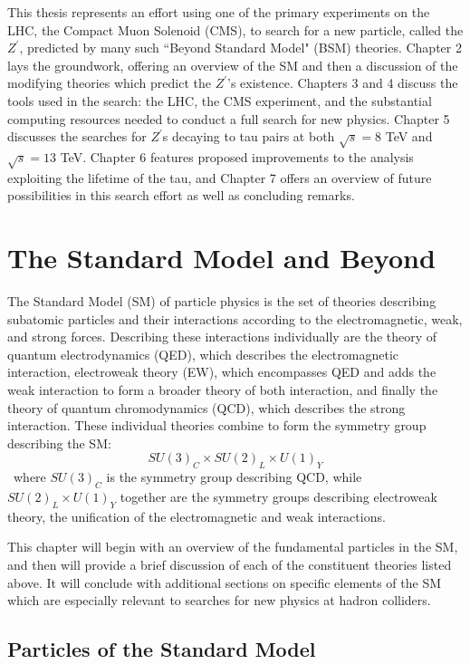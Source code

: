 This thesis represents an effort using one of the primary experiments on the LHC, the Compact Muon Solenoid (CMS), to search for a new particle, called the \emph{$Z^\prime$}, predicted by many such ``Beyond Standard Model" (BSM) theories. Chapter 2 lays the groundwork, offering an overview of the SM and then a discussion of the modifying theories which predict the $Z^\prime$'s existence. Chapters 3 and 4 discuss the tools used in the search: the LHC, the CMS experiment, and the substantial computing resources needed to conduct a full search for new physics. Chapter 5 discusses the searches for $Z^\prime$s decaying to tau pairs at both $\sqrt{s} = 8$ TeV and $\sqrt{s} = 13$ TeV. Chapter 6 features proposed improvements to the analysis exploiting the lifetime of the tau, and Chapter 7 offers an overview of future possibilities in this search effort as well as concluding remarks.
\clearpage

\chapter{The Standard Model and Beyond}


The Standard Model (SM) of particle physics is the set of theories describing subatomic particles and their interactions according to the electromagnetic, weak, and strong forces. Describing these interactions individually are the theory of quantum electrodynamics (QED), which describes the electromagnetic interaction, electroweak theory (EW), which encompasses QED and adds the weak interaction to form a broader theory of both interaction, and finally the theory of quantum chromodynamics (QCD), which describes the strong interaction. These individual theories combine to form the symmetry group describing the SM:
\begin{equation}
SU(3)_{C} \times SU(2)_{L} \times U(1)_{Y}
\end{equation}
\noindent\ where $SU(3)_{C}$ is the symmetry group describing QCD, while $SU(2)_{L} \times U(1)_{Y}$ together are the symmetry groups describing electroweak theory, the unification of the electromagnetic and weak interactions.

This chapter will begin with an overview of the fundamental particles in the SM, and then will provide a brief discussion of each of the constituent theories listed above. It will conclude with additional sections on specific elements of the SM which are especially relevant to searches for new physics at hadron colliders.

\section{Particles of the Standard Model}

